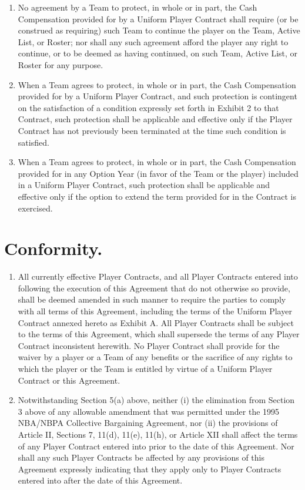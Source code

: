 \documentclass[
]{book}
\providecommand{\tightlist}{%
  \setlength{\itemsep}{0pt}\setlength{\parskip}{0pt}}
\begin{document}
\begin{enumerate}
\item
  No agreement by a Team to protect, in whole or in part, the Cash Compensation provided for by a Uniform Player Contract shall require (or be construed as requiring) such Team to continue the player on the Team, Active List, or Roster; nor shall any such agreement afford the player any right to continue, or to be deemed as having continued, on such Team, Active List, or Roster for any purpose.
\item
  When a Team agrees to protect, in whole or in part, the Cash Compensation provided for by a Uniform Player Contract, and such protection is contingent on the satisfaction of a condition expressly set forth in Exhibit 2 to that Contract, such protection shall be applicable and effective only if the Player Contract has not previously been terminated at the time such condition is satisfied.
\item
  When a Team agrees to protect, in whole or in part, the Cash Compensation provided for in any Option Year (in favor of the Team or the player) included in a Uniform Player Contract, such protection shall be applicable and effective only if the option to extend the term provided for in the Contract is exercised.
\end{enumerate}

\hypertarget{conformity.}{%
\section{Conformity.}\label{conformity.}}

\begin{enumerate}
\def\labelenumi{(\alph{enumi})}
\tightlist
\item
  All currently effective Player Contracts, and all Player Contracts entered into following the execution of this Agreement that do not otherwise so provide, shall be deemed amended in such manner to require the parties to comply with all terms of this Agreement, including the terms of the Uniform Player Contract annexed hereto as Exhibit A. All Player Contracts shall be subject to the terms of this Agreement, which shall supersede the terms of any Player Contract inconsistent herewith. No Player Contract shall provide for the waiver by a player or a Team of any benefits or the sacrifice of any rights to which the player or the Team is entitled by virtue of a Uniform Player Contract or this Agreement.
\item
  Notwithstanding Section 5(a) above, neither (i) the elimination from Section 3 above of any allowable amendment that was permitted under the 1995 NBA/NBPA Collective Bargaining Agreement, nor (ii) the provisions of Article II, Sections 7, 11(d), 11(e), 11(h), or Article XII shall affect the terms of any Player Contract entered into prior to the date of this Agreement. Nor shall any such Player Contracts be affected by any provisions of this Agreement expressly indicating that they apply only to Player Contracts entered into after the date of this Agreement.
\end{enumerate}
\end{document}
